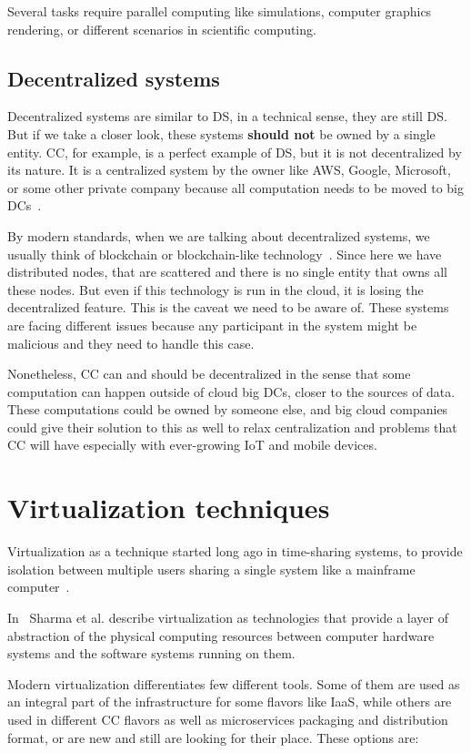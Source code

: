 Several tasks require parallel computing like simulations, computer graphics rendering, or different scenarios in scientific computing.
%
%
\subsection{Decentralized systems}\label{sec:decentralized_systems}
%
Decentralized systems are similar to DS, in a technical sense, they are still DS. But if we take a closer look, these systems \textbf{should not} be owned by a single entity. CC, for example, is a perfect example of DS, but it is not decentralized by its nature. It is a centralized system by the owner like AWS, Google, Microsoft, or some other private company because all computation needs to be moved to big DCs~\cite{HossainRH18}.

By modern standards, when we are talking about decentralized systems, we usually think of blockchain or blockchain-like technology~\cite{LeibleSSG19}. Since here we have distributed nodes, that are scattered and there is no single entity that owns all these nodes. But even if this technology is run in the cloud, it is losing the decentralized feature. This is the caveat we need to be aware of. These systems are facing different issues because any participant in the system might be malicious and they need to handle this case. 

Nonetheless, CC can and should be decentralized in the sense that some computation can happen outside of cloud big DCs, closer to the sources of data. These computations could be owned by someone else, and big cloud companies could give their solution to this as well to relax centralization and problems that CC will have especially with ever-growing IoT and mobile devices.
%
%
\section{Virtualization techniques}\label{sec:virtualization_techniques}
%
Virtualization as a technique started long ago in time-sharing systems, to provide isolation between multiple users sharing a single system like a mainframe computer~\cite{CrosbyB06}. 

In~\cite{Sharma} Sharma et al. describe virtualization as technologies that provide a layer of abstraction of the physical computing resources between computer hardware systems and the software systems running on them.

Modern virtualization differentiates few different tools. Some of them are used as an integral part of the infrastructure for some flavors like IaaS, while others are used in different CC flavors as well as microservices packaging and distribution format, or are new and still are looking for their place. These options are:


